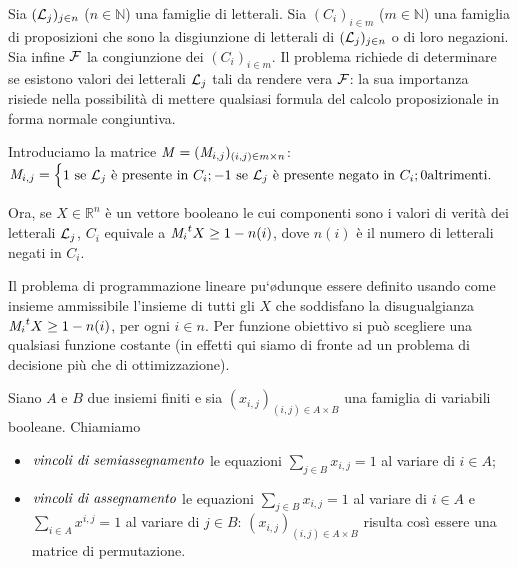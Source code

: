 \begin{Example}
	 Sia $(\mathcal{L}_j)_{j \in n}$ ($n \in \mathbb{N}$) una famiglie di letterali. Sia $(C_i)_{i \in m}$ ($m \in \mathbb{N}$) una famiglia di proposizioni che sono la disgiunzione di letterali di $(\mathcal{L}_j)_{j \in n}$ o di loro negazioni. Sia infine $\mathcal{F}$ la congiunzione dei $(C_i)_{i \in m}$. Il problema richiede di determinare se esistono valori dei letterali $\mathcal{L}_j$ tali da rendere vera $\mathcal{F}$: la sua importanza risiede nella possibilit\`a di mettere qualsiasi formula del calcolo proposizionale in forma normale congiuntiva.
	\par Introduciamo la matrice $\mathit{M} = (\mathit{M}_{i,j})_{(i,j) \in m \times n}$: $\mathit{M}_{i,j} = \begin{cases} 1 \text{ se }\mathcal{L}_j\text{ \`e presente in } C_i; -1 \text{ se }\mathcal{L}_j\text{ \`e presente negato in } C_i;0 \text{altrimenti}.\end{cases}$
	\par Ora, se $X \in \mathbb{R}^n$ \`e un vettore booleano le cui componenti sono i valori di verit\`a dei letterali $\mathcal{L}_j$, $C_i$ equivale a ${\mathit{M}_i}^t X \geq 1 - n(i)$, dove $n(i)$ \`e il numero di letterali negati in $C_i$.
	\par Il problema di programmazione lineare pu`\o dunque essere definito usando come insieme ammissibile l'insieme di tutti gli $X$ che soddisfano la disugualgianza ${\mathit{M}_i}^t X \geq 1 - n(i)$, per ogni $i \in n$. Per funzione obiettivo si pu\`o scegliere una qualsiasi funzione costante (in effetti qui siamo di fronte ad un problema di decisione pi\`u che di ottimizzazione).
\end{Example}
\begin{Definition}
	Siano $A$ e $B$ due insiemi finiti e sia $(x_{i,j})_{(i,j) \in A \times B}$ una famiglia di variabili booleane. Chiamiamo
	\begin{itemize}
	\item $\Define{vincoli di semiassegnamento}[di semiassegnamento][vincoli]$ le equazioni $\sum_{j \in B} x_{i,j} = 1$ al variare di $i \in A$;
	\item $\Define{vincoli di assegnamento}[di assegnamento][vincoli]$ le equazioni $\sum_{j \in B} x_{i,j} = 1$ al variare di $i \in A$ e $\sum_{i \in A} x^{i,j} = 1$ al variare di $j \in B$: $(x_{i,j})_{(i,j) \in A \times B}$ risulta cos\`i essere una matrice di permutazione.
	\end{itemize}
\end{Definition}
